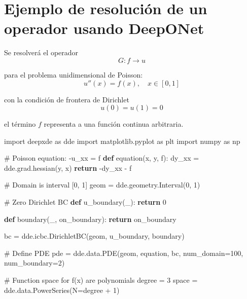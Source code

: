 \documentclass[
  spanish,
  us-letterpaper,
  DIV=11,
  numbers=noendperiod]{scrreprt}
\newenvironment{Shaded}{\begin{snugshade}}{\end{snugshade}}
\newcommand{\CommentTok}[1]{\textcolor[rgb]{0.37,0.37,0.37}{#1}}
\newcommand{\ControlFlowTok}[1]{\textcolor[rgb]{0.00,0.23,0.31}{\textbf{#1}}}
\newcommand{\DecValTok}[1]{\textcolor[rgb]{0.68,0.00,0.00}{#1}}
\newcommand{\ImportTok}[1]{\textcolor[rgb]{0.00,0.46,0.62}{#1}}
\newcommand{\KeywordTok}[1]{\textcolor[rgb]{0.00,0.23,0.31}{\textbf{#1}}}
\newcommand{\NormalTok}[1]{\textcolor[rgb]{0.00,0.23,0.31}{#1}}
\newcommand{\OperatorTok}[1]{\textcolor[rgb]{0.37,0.37,0.37}{#1}}
\theoremstyle{plain}
\theoremstyle{definition}
\theoremstyle{remark}
\begin{document}
\section{Ejemplo de resolución de un operador usando
DeepONet}\label{ejemplo-de-resoluciuxf3n-de-un-operador-usando-deeponet}

Se resolverá el operador \[
G: f\rightarrow u
\]

para el problema unidimensional de Poisson: \[
u''(x) = f(x), \quad x\in[0,1]
\]

con la condición de frontera de Dirichlet \[
u(0)=u(1)=0
\]

el término \(f\) representa a una función continua arbitraria.

\begin{Shaded}
\begin{Highlighting}[]
\ImportTok{import}\NormalTok{ deepxde }\ImportTok{as}\NormalTok{ dde}
\ImportTok{import}\NormalTok{ matplotlib.pyplot }\ImportTok{as}\NormalTok{ plt}
\ImportTok{import}\NormalTok{ numpy }\ImportTok{as}\NormalTok{ np}


\CommentTok{\# Poisson equation: {-}u\_xx = f}
\KeywordTok{def}\NormalTok{ equation(x, y, f):}
\NormalTok{    dy\_xx }\OperatorTok{=}\NormalTok{ dde.grad.hessian(y, x)}
    \ControlFlowTok{return} \OperatorTok{{-}}\NormalTok{dy\_xx }\OperatorTok{{-}}\NormalTok{ f}

\CommentTok{\# Domain is interval [0, 1]}
\NormalTok{geom }\OperatorTok{=}\NormalTok{ dde.geometry.Interval(}\DecValTok{0}\NormalTok{, }\DecValTok{1}\NormalTok{)}

\CommentTok{\# Zero Dirichlet BC}
\KeywordTok{def}\NormalTok{ u\_boundary(\_):}
    \ControlFlowTok{return} \DecValTok{0}

\KeywordTok{def}\NormalTok{ boundary(\_, on\_boundary):}
    \ControlFlowTok{return}\NormalTok{ on\_boundary}

\NormalTok{bc }\OperatorTok{=}\NormalTok{ dde.icbc.DirichletBC(geom, u\_boundary, boundary)}

\CommentTok{\# Define PDE}
\NormalTok{pde }\OperatorTok{=}\NormalTok{ dde.data.PDE(geom, equation, bc, num\_domain}\OperatorTok{=}\DecValTok{100}\NormalTok{, num\_boundary}\OperatorTok{=}\DecValTok{2}\NormalTok{)}

\CommentTok{\# Function space for f(x) are polynomials}
\NormalTok{degree }\OperatorTok{=} \DecValTok{3}
\NormalTok{space }\OperatorTok{=}\NormalTok{ dde.data.PowerSeries(N}\OperatorTok{=}\NormalTok{degree }\OperatorTok{+} \DecValTok{1}\NormalTok{)}


\end{Highlighting}
\end{Shaded}
\end{document}
